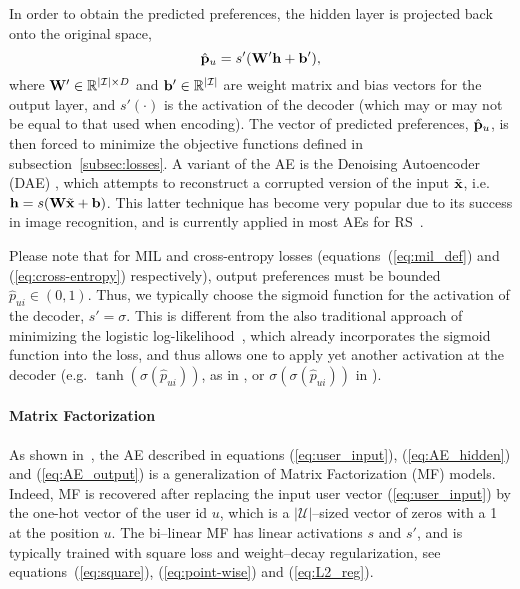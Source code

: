 In order to obtain the predicted preferences, the hidden layer is projected back onto the original space, 
\begin{equation}\label{eq:AE_output}
\hat{\bf p}_u = s'({\bf W}'{\bf h}+{\bf b}'),
\end{equation}
where ${\bf W}'\in\mathbb{R}^{|\mathcal{I}|\times D}$  and ${\bf b}'\in\mathbb{R}^{|\mathcal{I}|}$ are weight matrix and bias vectors for the output layer,
and $s'(\cdot)$ is the activation of the decoder (which may or may not be equal to that used when encoding). 
The vector of predicted preferences, $\hat{\bf p}_u$, is then forced to minimize the objective functions defined in subsection~\ref{subsec:losses}. 
A variant of the AE is the Denoising Autoencoder (DAE) \cite{Vincent:2008:ECRF-AE}, which attempts to
reconstruct a corrupted version of the input $\tilde{{\bf x}}$, i.e. ${\bf h} = s({\bf W}\tilde{{\bf x}}+{\bf b})$. This latter technique has become very popular due to its success in image recognition, and is currently applied in most AEs for RS~\cite{Wu:2016:CDAE-topN, liang:2018:VAE}. 

Please note that for MIL and cross-entropy losses (equations~(\ref{eq:mil_def}) and (\ref{eq:cross-entropy}) respectively), output preferences must be bounded $\hat{p}_{ui}\in(0, 1)$. Thus, we typically choose the sigmoid function for the activation of the decoder, $s'=\sigma$. This is different from the also traditional approach of minimizing the logistic log-likelihood~\cite{Wu:2016:CDAE-topN, liang:2018:VAE}, which already incorporates the sigmoid function into the loss, and thus allows one to apply yet another activation at the decoder (e.g. $\tanh(\sigma(\hat{p}_{ui}))$, as in \cite{liang:2018:VAE}, or $\sigma(\sigma(\hat{p}_{ui}))$ in \cite{Wu:2016:CDAE-topN}). 
\paragraph{Matrix Factorization}

As shown in~\cite{Wu:2016:CDAE-topN}, the AE described in equations (\ref{eq:user_input}), (\ref{eq:AE_hidden}) and (\ref{eq:AE_output}) is a generalization of Matrix Factorization (MF) models. Indeed, MF is recovered after replacing the input user vector (\ref{eq:user_input}) by the one-hot vector of the user id $u$, which is a $|\mathcal{U}|$--sized vector of zeros with a 1 at the position $u$. The bi--linear MF has linear activations $s$ and $s'$, and is typically trained with square loss and weight--decay regularization, see equations~(\ref{eq:square}), (\ref{eq:point-wise}) and (\ref{eq:L2_reg}).

